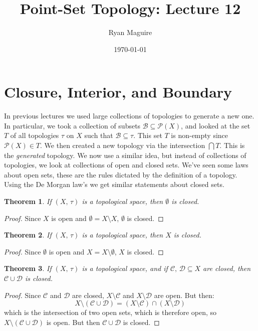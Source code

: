 \documentclass{article}
\title{Point-Set Topology: Lecture 12}
\author{Ryan Maguire}
\date{\today}
\theoremstyle{plain}
\newtheorem{theorem}{Theorem}[section]
\theoremstyle{normal}
\begin{document}
    \maketitle
    \section{Closure, Interior, and Boundary}
        In previous lectures we used large collections of topologies to
        generate a new one. In particular, we took a collection
        of subsets $\mathcal{B}\subseteq\mathcal{P}(X)$, and looked at the
        set $T$ of all topologies $\tau$ on $X$ such that
        $\mathcal{B}\subseteq\tau$. This set $T$ is non-empty since
        $\mathcal{P}(X)\in{T}$. We then created a new topology via the
        intersection $\bigcap{T}$. This is the \textit{generated} topology.
        We now use a similar idea, but instead of collections of topologies,
        we look at collections of open and closed sets. We've seen some laws
        about open sets, these are the rules dictated by the definition of a
        topology. Using the De Morgan law's we get similar statements about
        closed sets.
        \begin{theorem}
            If $(X,\,\tau)$ is a topological space, then $\emptyset$ is closed.
        \end{theorem}
        \begin{proof}
            Since $X$ is open and $\emptyset=X\setminus{X}$, $\emptyset$ is
            closed.
        \end{proof}
        \begin{theorem}
            If $(X,\,\tau)$ is a topological space, then $X$ is closed.
        \end{theorem}
        \begin{proof}
            Since $\emptyset$ is open and $X=X\setminus\emptyset$, $X$ is
            closed.
        \end{proof}
        \begin{theorem}
            If $(X,\,\tau)$ is a topological space, and if
            $\mathcal{C},\,\mathcal{D}\subseteq{X}$ are closed, then
            $\mathcal{C}\cup\mathcal{D}$ is closed.
        \end{theorem}
        \begin{proof}
            Since $\mathcal{C}$ and $\mathcal{D}$ are closed,
            $X\setminus\mathcal{C}$ and $X\setminus\mathcal{D}$ are open.
            But then:
            \begin{equation}
                X\setminus(\mathcal{C}\cup\mathcal{D})
                =(X\setminus\mathcal{C})\cap(X\setminus\mathcal{D})
            \end{equation}
            which is the intersection of two open sets, which is therefore open,
            so $X\setminus(\mathcal{C}\cup\mathcal{D})$ is open. But then
            $\mathcal{C}\cup\mathcal{D}$ is closed.
        \end{proof}
\end{document}
